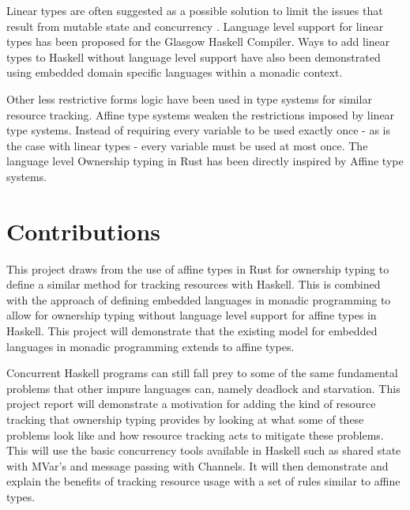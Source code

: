 \documentclass[onehalf,11pt]{beavtex}
\begin{document}
Linear types are often suggested as a possible solution to limit the issues that
result from mutable state \cite{Wadler90lineartypes} and concurrency
\cite{caires2010session}.  Language level support for linear types has been
proposed for the Glasgow Haskell Compiler. \cite{LinearTypesGHC}
Ways to add linear types to Haskell without language level support have also
been demonstrated using embedded domain specific languages within a monadic
context. \cite{Paykin:2017:LM:3122955.3122965}

Other less restrictive forms logic have been used in type systems for similar
resource tracking.
Affine type systems weaken the restrictions imposed by linear type systems.
Instead of requiring every variable to be used exactly once - as is the case
with linear types - every variable must be used at most once.
The language level Ownership typing in Rust has been directly inspired by Affine
type systems.

\section{Contributions}

This project draws from the use of affine types in Rust for
ownership typing to define a similar method for tracking resources with Haskell.
This is combined with the approach of defining embedded languages in monadic
programming to allow for ownership typing without language level support for
affine types in Haskell. This project will demonstrate that the existing model
for embedded languages in monadic programming extends to affine types.

Concurrent Haskell programs can still fall prey to some of the same fundamental
problems that other impure languages can, namely deadlock and starvation.
This project report will demonstrate a motivation for adding the kind of
resource tracking that ownership typing provides by looking at what some of
these problems look like and how resource tracking acts to mitigate these
problems.  This will use the basic concurrency tools available in Haskell
such as shared state with MVar's and message passing with Channels.
It will then demonstrate and explain the benefits of tracking resource usage
with a set of rules similar to affine types.
\end{document}
